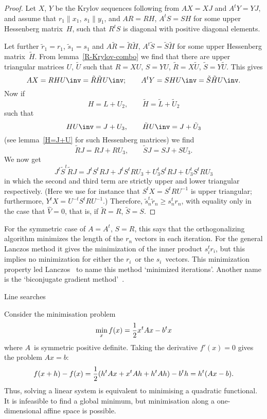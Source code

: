 \begin{proof}
Let $X$, $Y$ be the Krylov sequences following from $AX=XJ$ and
$A^tY=YJ$, and assume that $r_1\parallel x_1$, $s_1\parallel y_1$, and
$AR=RH$, $A^tS=SH$ for some upper Hessenberg matrix~$H$, such that $R^tS$
is diagonal with positive diagonal elements.

Let further $\tilde r_1=r_1$, $\tilde s_1=s_1$ and
$A\tilde R=\tilde R\tilde H$, $A^t\tilde S=\tilde S\tilde H$ for some
upper Hessenberg matrix~$\tilde H$. 
From lemma~\ref{R-Krylov-combo} we
find that there are upper triangular matrices $U$, $\tilde U$ such
that $R=XU$, $S=YU$, $\tilde R=X\tilde U$, $\tilde S=Y\tilde U$.
This gives
\[ AX=RHU\inv=\tilde R\tilde HU\inv;\qquad
   A^tY=SHU\inv=\tilde S\tilde HU\inv. \]
Now if \[ H=L+U_2,\qquad \tilde H=\tilde L+\tilde U_2 \]
such that
\[ HU\inv = J+U_3,\qquad \tilde HU\inv=J+\tilde U_3 \]
(see lemma~\ref{H=J+U} for such Hessenberg matrices)
we find
\[ \tilde RJ=RJ+RU_3,\qquad \tilde SJ=SJ+SU_3.\]
We now get
\[ J^t\tilde S^t\tilde RJ=J^tS^tRJ+J^tS^tRU_3+U_3^tS^tRJ
   +U_3^tS^tRU_3 \]
in which the second and third term are strictly upper and lower
triangular respectively. (Here we use for instance that $S^tX=S^tRU^{-1}$
is upper triangular; furthermore, $Y^tX=U^{-t}S^tRU^{-1}$.)
Therefore, $\tilde s_n^t\tilde r_n\geq
s_n^tr_n$, with equality only in the case that $\hat V=0$, that is,
if $\tilde R=R$, $\tilde S=S$.
\end{proof}

For the symmetric case of $A=A^t$, $S=R$, this says that the
orthogonalizing algorithm minimizes the length of the $r_n$ vectors in
each iteration. For the general
Lanczos method it gives the minimization of
the inner product $s_i^tr_i$, but this implies no minimization for
either the $r_i$~or the $s_i$~vectors. This minimization property led
Lanczos~\cite{Lanczos1950:iteration_method,Lanczos1952:solution_of_systems}
to name this method `minimized iterations'. Another name is the
`biconjugate gradient method'~\cite{Fletcher1975:indefinite}.

 {Line searches}
\label{sec:line-search}
\FurtherReading

Consider the minimisation problem \[ \min_x f(x)={1\over 2}x^tAx-b^tx \]
where $A$~is symmetric positive definite. Taking the derivative
$f'(x)=0$ gives the problem $Ax=b$:
\[ f(x+h)-f(x)= {1\over2}(h^tAx+x^tAh+h^tAh)-b^th=h^t(Ax-b). \]
Thus, solving a linear system is equivalent to minimising a quadratic
functional.  It is infeasible to find a global minimum, but
minimisation along a one-dimensional affine space is possible.

